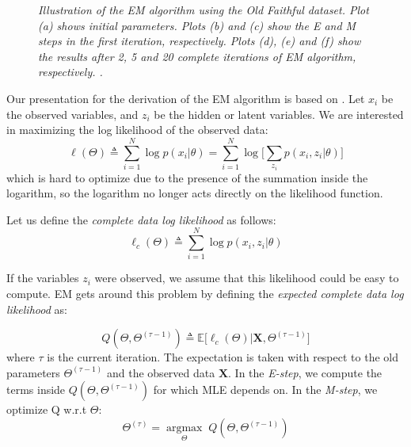 \begin{figure}[ht!]
\begin{center}
{        }
    \end{center}
    \caption{\emph{Illustration of the EM algorithm using the Old Faithful dataset. Plot (a) shows initial parameters. Plots (b) and (c) show the E and M steps in the first iteration, respectively. Plots (d), (e) and (f) show the results after 2, 5 and 20 complete iterations of EM algorithm, respectively. \cite[Ch. \ 9]{Bishop2006}.}}
   \label{em-algorithm-pic}
\end{figure}

Our presentation for the derivation of the EM algorithm is based on \cite[Ch. \ 11]{Murphy2012}. Let $x_{i}$ be the observed variables, and $z_{i}$ be the hidden or latent variables. We are interested in maximizing the log likelihood of the observed data:
\begin{equation} \label{log-lik-observed-f-mm}
	\ell(\Theta) \triangleq \sum_{i=1}^{N} \log p(x_{i}|\theta) =  \sum_{i=1}^{N} \log \bigg[\sum_{z_{i}} p(x_{i}, z_{i}|\theta) \bigg]
\end{equation}
which is hard to optimize due to the presence of the summation inside the logarithm, so the logarithm no longer acts directly on the likelihood function.

Let us define the \emph{complete data log likelihood} as follows:
\begin{equation} \label{log-lik-comp-observed-f-mm}
	\ell_{c}(\Theta) \triangleq \sum_{i=1}^{N} \log p(x_{i}, z_{i}|\theta)
\end{equation}

If the variables $z_{i}$ were observed, we assume that this likelihood could be easy to compute. EM gets around this problem by defining the \emph{expected complete data log likelihood} as:

\begin{equation} \label{log-lik-expected-f-mm}
		Q(\Theta, \Theta^{(\tau-1)}) \triangleq \mathbb{E} \big[\ell_{c}(\Theta) | \mathbf{X}, \Theta^{(\tau-1)}\big]
\end{equation}
where $\tau$ is the current iteration. The expectation is taken with respect to the old parameters $\Theta^{(\tau-1)}$ and the observed data $\mathbf{X}$. In the \emph{E-step}, we compute the terms inside $Q(\Theta, \Theta^{(\tau-1)})$ for which MLE depends on. In the \emph{M-step}, we optimize Q w.r.t $\Theta$:
\begin{equation} \label{max-log-lik-observed-f-mm}
	\Theta^{(\tau)} = \underset{\Theta}{\operatorname{argmax}} \; Q(\Theta, \Theta^{(\tau-1)})
\end{equation}

